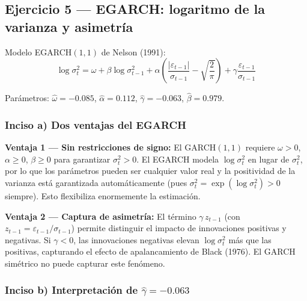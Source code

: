\documentclass[12pt,a4paper]{article}
\begin{document}
\subsection{Ejercicio 5 — EGARCH: logaritmo de la varianza y asimetría}

Modelo EGARCH$(1,1)$ de Nelson (1991):
\begin{equation}
\log\sigma_t^2 = \omega + \beta\log\sigma_{t-1}^2 + \alpha\left(\frac{|\varepsilon_{t-1}|}{\sigma_{t-1}}-\sqrt{\frac{2}{\pi}}\right) + \gamma\frac{\varepsilon_{t-1}}{\sigma_{t-1}}
\end{equation}

Parámetros: $\hat{\omega}=-0.085$, $\hat{\alpha}=0.112$, $\hat{\gamma}=-0.063$, $\hat{\beta}=0.979$.

\subsubsection*{Inciso a) Dos ventajas del EGARCH}

\begin{solucion}
\textbf{Ventaja 1 — Sin restricciones de signo:} El GARCH$(1,1)$ requiere $\omega>0$, $\alpha\geq0$, $\beta\geq0$ para garantizar $\sigma_t^2>0$. El EGARCH modela $\log\sigma_t^2$ en lugar de $\sigma_t^2$, por lo que los parámetros pueden ser cualquier valor real y la positividad de la varianza está garantizada automáticamente (pues $\sigma_t^2=\exp(\log\sigma_t^2)>0$ siempre). Esto flexibiliza enormemente la estimación.

\textbf{Ventaja 2 — Captura de asimetría:} El término $\gamma\,z_{t-1}$ (con $z_{t-1}=\varepsilon_{t-1}/\sigma_{t-1}$) permite distinguir el impacto de innovaciones positivas y negativas. Si $\gamma<0$, las innovaciones negativas elevan $\log\sigma_t^2$ más que las positivas, capturando el efecto de apalancamiento de Black (1976). El GARCH simétrico no puede capturar este fenómeno.
\end{solucion}

\subsubsection*{Inciso b) Interpretación de $\hat{\gamma}=-0.063$}
\end{document}
